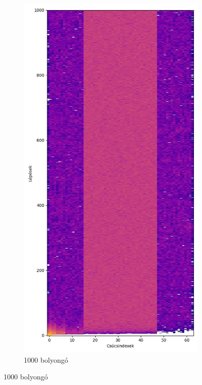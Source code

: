 \begin{figure}[H]
\begin{subfigure}{.45\linewidth}
  \end{subfigure}
  \begin{subfigure}{.45\linewidth}
    \centering
    \includegraphics[width=\linewidth]{./figures/ragasztott_binaris/sim03.jpg}
    \caption{1000 bolyongó}
  \end{subfigure}
\end{figure}

